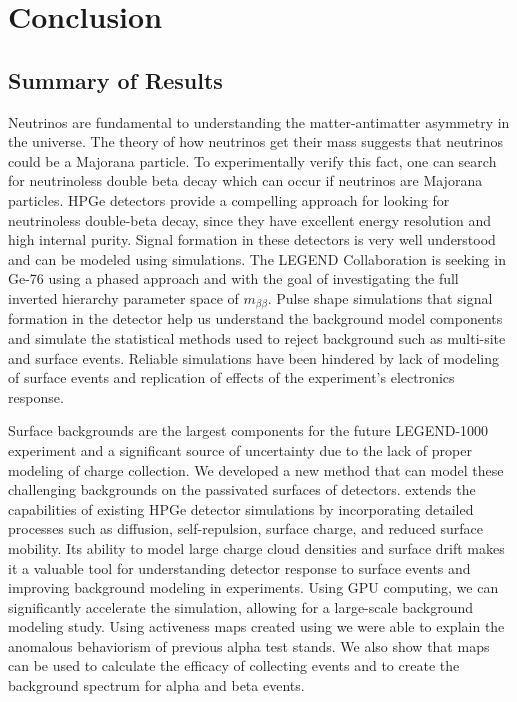 \chapter{Conclusion}
\label{chap:conclusion}
\section{Summary of Results}
Neutrinos are fundamental to understanding the matter-antimatter asymmetry in the universe. The theory of how neutrinos get their mass suggests that neutrinos could be a Majorana particle. To experimentally verify this fact, one can search for neutrinoless double beta decay which can occur if neutrinos are Majorana particles. HPGe detectors provide a compelling approach for looking for neutrinoless double-beta decay, since they have excellent energy resolution and high internal purity. Signal formation in these detectors is very well understood and can be modeled using simulations. The LEGEND Collaboration is seeking {\onbb} in Ge-76 using a phased approach and with the goal of investigating the full inverted hierarchy parameter space of $m_{\beta \beta}$. Pulse shape simulations that signal formation in the detector help us understand the background model components and simulate the statistical methods used to reject background such as multi-site and surface events. Reliable simulations have been hindered by lack of modeling of surface events and replication of effects of the experiment's electronics response.

Surface backgrounds are the largest components for the future LEGEND-1000 experiment and a significant source of uncertainty due to the lack of proper modeling of charge collection. We developed a new method that can model these challenging backgrounds on the passivated surfaces of detectors. {\ehd} extends the capabilities of existing HPGe detector simulations by incorporating detailed processes such as diffusion, self-repulsion, surface charge, and reduced surface mobility. Its ability to model large charge cloud densities and surface drift makes it a valuable tool for understanding detector response to surface events and improving background modeling in experiments. Using GPU computing, we can significantly accelerate the simulation, allowing for a large-scale background modeling study. Using activeness maps created using {\ehd} we were able to explain the anomalous behaviorism of previous alpha test stands. We also show that maps can be used to calculate the efficacy of collecting {\onbb} events and to create the background spectrum for alpha and beta events.

